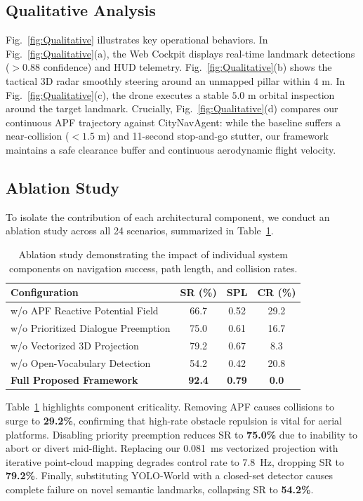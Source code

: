 \documentclass[conference]{IEEEtran}
\begin{document}
\subsection{Qualitative Analysis}
Fig.~\ref{fig:Qualitative} illustrates key operational behaviors. In Fig.~\ref{fig:Qualitative}(a), the Web Cockpit displays real-time landmark detections ($>0.88$ confidence) and HUD telemetry. Fig.~\ref{fig:Qualitative}(b) shows the tactical 3D radar smoothly steering around an unmapped pillar within $4\text{ m}$. In Fig.~\ref{fig:Qualitative}(c), the drone executes a stable $5.0\text{ m}$ orbital inspection around the target landmark. Crucially, Fig.~\ref{fig:Qualitative}(d) compares our continuous APF trajectory against CityNavAgent: while the baseline suffers a near-collision ($<1.5\text{ m}$) and 11-second stop-and-go stutter, our framework maintains a safe clearance buffer and continuous aerodynamic flight velocity.

\subsection{Ablation Study}
\enlargethispage{3.5\baselineskip}
To isolate the contribution of each architectural component, we conduct an ablation study across all 24 scenarios, summarized in Table~\ref{tab:ablation}.

\begin{table}[htbp]
	\centering
	\footnotesize
	\setlength{\tabcolsep}{4.5pt}
	\renewcommand{\arraystretch}{1.1}
	\begin{tabular}{lccc}
		\hline
		\textbf{Configuration} & \textbf{SR (\%)} & \textbf{SPL} & \textbf{CR (\%)} \\
		\hline
		w/o APF Reactive Potential Field & 66.7 & 0.52 & 29.2 \\
		w/o Prioritized Dialogue Preemption & 75.0 & 0.61 & 16.7 \\
		w/o Vectorized 3D Projection & 79.2 & 0.67 & 8.3 \\
		w/o Open-Vocabulary Detection & 54.2 & 0.42 & 20.8 \\
		\textbf{Full Proposed Framework} & \textbf{92.4} & \textbf{0.79} & \textbf{0.0} \\
		\hline
	\end{tabular}
	\caption{Ablation study demonstrating the impact of individual system components on navigation success, path length, and collision rates.}
	\label{tab:ablation}
\end{table}

Table~\ref{tab:ablation} highlights component criticality. Removing APF causes collisions to surge to \textbf{29.2\%}, confirming that high-rate obstacle repulsion is vital for aerial platforms. Disabling priority preemption reduces SR to \textbf{75.0\%} due to inability to abort or divert mid-flight. Replacing our 0.081~ms vectorized projection with iterative point-cloud mapping degrades control rate to 7.8~Hz, dropping SR to \textbf{79.2\%}. Finally, substituting YOLO-World with a closed-set detector causes complete failure on novel semantic landmarks, collapsing SR to \textbf{54.2\%}.
\end{document}
